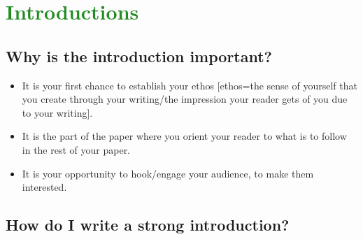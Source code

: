 

\section{\textcolor{ForestGreen}{Introductions}}


 
\subsection {Why is the introduction important?}
 
\begin{itemize}
\item It is your first chance to establish your ethos [ethos=the sense of yourself that you create through your writing/the impression your reader gets of you due to your writing].
 
\item It is the part of the paper where you orient your reader to what is to follow in the rest of your paper.
 
\item It is your opportunity to hook/engage your audience, to make them interested.
\end{itemize}

\subsection{How do I write a strong introduction?}

